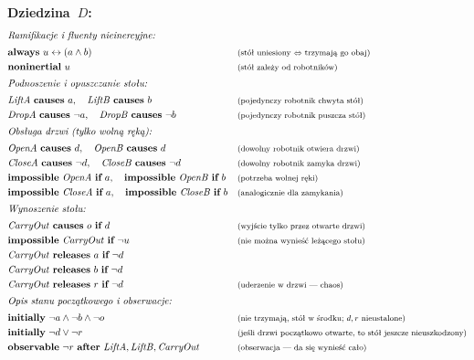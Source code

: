 \documentclass[11pt,a4paper]{article}
\newcommand{\causes}{\textbf{causes}}
\newcommand{\aft}{\textbf{after}}
\renewcommand{\iff}{\textbf{if}}
\newcommand{\initially}{\textbf{initially}}
\newcommand{\always}{\textbf{always}}
\newcommand{\impossible}{\textbf{impossible}}
\newcommand{\releases}{\textbf{releases}}
\newcommand{\noninertial}{\textbf{noninertial}}
\newcommand{\observable}{\textbf{observable}}
\newcommand{\cmt}[1]{\text{\footnotesize\normalfont (#1)}}
\theoremstyle{definition}
\begin{document}
\medskip
\noindent\textbf{Dziedzina~$D$:}
{\small
\begin{align*}
  \shortintertext{\textit{Ramifikacje i~fluenty nieinercyjne:}}
  &\always\ u \leftrightarrow (a \land b)
    && \cmt{stół uniesiony $\Leftrightarrow$ trzymają go obaj} \\
  &\noninertial\ u
    && \cmt{stół zależy od~robotników} \\
  \shortintertext{\textit{Podnoszenie i~opuszczanie stołu:}}
  &\mathit{LiftA}\ \causes\ a,
   \quad \mathit{LiftB}\ \causes\ b
    && \cmt{pojedynczy robotnik chwyta stół} \\
  &\mathit{DropA}\ \causes\ \neg a,
   \quad \mathit{DropB}\ \causes\ \neg b
    && \cmt{pojedynczy robotnik puszcza stół} \\
  \shortintertext{\textit{Obsługa drzwi (tylko wolną ręką):}}
  &\mathit{OpenA}\ \causes\ d,
   \quad \mathit{OpenB}\ \causes\ d
    && \cmt{dowolny robotnik otwiera drzwi} \\
  &\mathit{CloseA}\ \causes\ \neg d,
   \quad \mathit{CloseB}\ \causes\ \neg d
    && \cmt{dowolny robotnik zamyka drzwi} \\
  &\impossible\ \mathit{OpenA}\ \iff\ a,
   \quad \impossible\ \mathit{OpenB}\ \iff\ b
    && \cmt{potrzeba wolnej ręki} \\
  &\impossible\ \mathit{CloseA}\ \iff\ a,
   \quad \impossible\ \mathit{CloseB}\ \iff\ b
    && \cmt{analogicznie dla zamykania} \\
  \shortintertext{\textit{Wynoszenie stołu:}}
  &\mathit{CarryOut}\ \causes\ o\ \iff\ d
    && \cmt{wyjście tylko przez otwarte drzwi} \\
  &\impossible\ \mathit{CarryOut}\ \iff\ \neg u
    && \cmt{nie można wynieść leżącego stołu} \\
  &\mathit{CarryOut}\ \releases\ a\ \iff\ \neg d \\
  &\mathit{CarryOut}\ \releases\ b\ \iff\ \neg d \\
  &\mathit{CarryOut}\ \releases\ r\ \iff\ \neg d
    && \cmt{uderzenie w~drzwi --- chaos} \\
  \shortintertext{\textit{Opis stanu początkowego i~obserwacje:}}
  &\initially\ \neg a \land \neg b \land \neg o
    && \cmt{nie trzymają, stół w~środku; $d,r$ nieustalone} \\
  &\initially\ \neg d \lor \neg r
    && \cmt{jeśli drzwi początkowo otwarte, to~stół jeszcze nieuszkodzony} \\
  &\observable\ \neg r\ \aft\ \mathit{LiftA}, \mathit{LiftB}, \mathit{CarryOut}
    && \cmt{obserwacja --- da się wynieść cało}
\end{align*}
}
\end{document}
